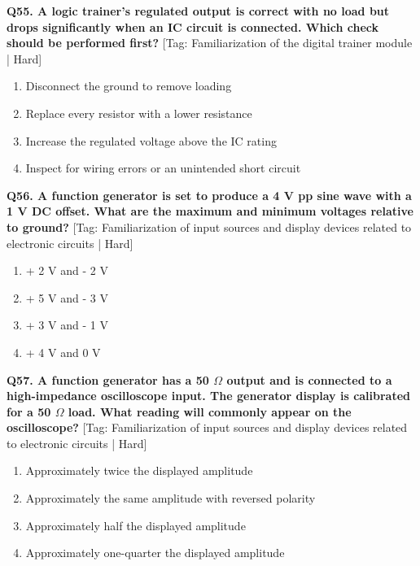 \noindent\textbf{Q55. A logic trainer's regulated output is correct with no load but drops significantly when an IC circuit is connected. Which check should be performed first?} \hfill [Tag: Familiarization of the digital trainer module | Hard]
\begin{enumerate}[label=(\alph*),topsep=2pt,itemsep=1pt,partopsep=0pt,parsep=0pt]
    \item {Disconnect the ground to remove loading}
    \item {Replace every resistor with a lower resistance}
    \item {Increase the regulated voltage above the IC rating}
    \item {Inspect for wiring errors or an unintended short circuit}
\end{enumerate}
\vspace{2mm}

\noindent\textbf{Q56. A function generator is set to produce a 4 V pp sine wave with a 1 V DC offset. What are the maximum and minimum voltages relative to ground?} \hfill [Tag: Familiarization of input sources and display devices related to electronic circuits | Hard]
\begin{enumerate}[label=(\alph*),topsep=2pt,itemsep=1pt,partopsep=0pt,parsep=0pt]
    \item {+ 2 V and - 2 V}
    \item {+ 5 V and - 3 V}
    \item {+ 3 V and - 1 V}
    \item {+ 4 V and 0 V}
\end{enumerate}
\vspace{2mm}

\noindent\textbf{Q57. A function generator has a 50 $\Omega$ output and is connected to a high-impedance oscilloscope input. The generator display is calibrated for a 50 $\Omega$ load. What reading will commonly appear on the oscilloscope?} \hfill [Tag: Familiarization of input sources and display devices related to electronic circuits | Hard]
\begin{enumerate}[label=(\alph*),topsep=2pt,itemsep=1pt,partopsep=0pt,parsep=0pt]
    \item {Approximately twice the displayed amplitude}
    \item {Approximately the same amplitude with reversed polarity}
    \item {Approximately half the displayed amplitude}
    \item {Approximately one-quarter the displayed amplitude}
\end{enumerate}
\vspace{2mm}

